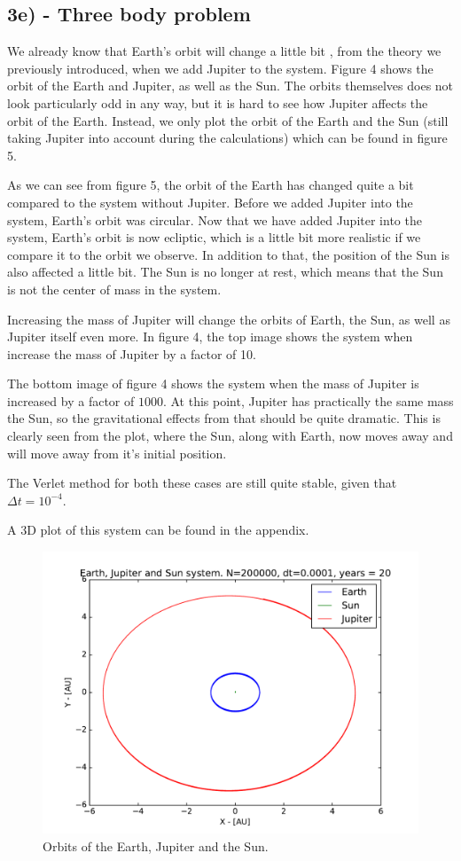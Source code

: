 \documentclass[12pt]{article}
\begin{document}
\newpage 
\subsection*{3e) - Three body problem}
We already know that Earth's orbit will change a little bit , from the theory we previously introduced, when we add Jupiter to the system. Figure 4 shows the orbit of the Earth and Jupiter, as well as the Sun. The orbits themselves does not look particularly odd in any way, but it is hard to see how Jupiter affects the orbit of the Earth. Instead, we only plot the orbit of the Earth and the Sun (still taking Jupiter into account during the calculations) which can be found in figure 5. 

As we can see from figure 5, the orbit of the Earth has changed quite a bit compared to the system without Jupiter. Before we added Jupiter into the system, Earth's orbit was circular. Now that we have added Jupiter into the system, Earth's orbit is now ecliptic, which is a little bit more realistic if we compare it to the orbit we observe. In addition to that, the position of the Sun is also affected a little bit. The Sun is no longer at rest, which means that the Sun is not the center of mass in the system.

Increasing the mass of Jupiter will change the orbits of Earth, the Sun, as well as Jupiter itself even more. In figure 4, the top image shows the system when increase the mass of Jupiter by a factor of 10. 

The bottom image of figure 4 shows the system when the mass of Jupiter is increased by a factor of $1000$. At this point, Jupiter has practically the same mass the Sun, so the gravitational effects from that should be quite dramatic. This is clearly seen from the plot, where the Sun, along with Earth, now moves away and will move away from it's initial position. 

The Verlet method for both these cases are still quite stable, given that $\Delta t = 10^{-4}$.

A 3D plot of this system can be found in the appendix.

\begin{figure}[hbtp]
\centering
\includegraphics[width=\linewidth]{Plots/Earth_Sun_Jupiter.pdf}
\caption{Orbits of the Earth, Jupiter and the Sun.}
\end{figure}
\end{document}
